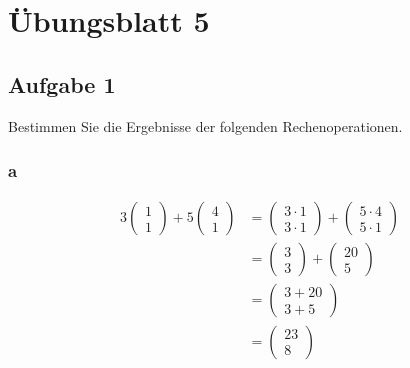 \chapter{Übungsblatt 5}

\section{Aufgabe 1}
Bestimmen Sie die Ergebnisse der folgenden Rechenoperationen.

\subsection{a}
\begin{align*}
  3\begin{pmatrix} 1 \\ 1 \end{pmatrix} + 5 \begin{pmatrix} 4 \\ 1 \end{pmatrix}
  &= \begin{pmatrix} 3 \cdot 1 \\ 3 \cdot 1 \end{pmatrix} + \begin{pmatrix} 5 \cdot 4 \\ 5 \cdot 1 \end{pmatrix} \\
  &= \begin{pmatrix} 3 \\ 3 \end{pmatrix} + \begin{pmatrix} 20 \\ 5 \end{pmatrix} \\
  &= \begin{pmatrix} 3+20 \\ 3+5 \end{pmatrix} \\  
  &= \begin{pmatrix} 23 \\ 8 \end{pmatrix}
\end{align*}

